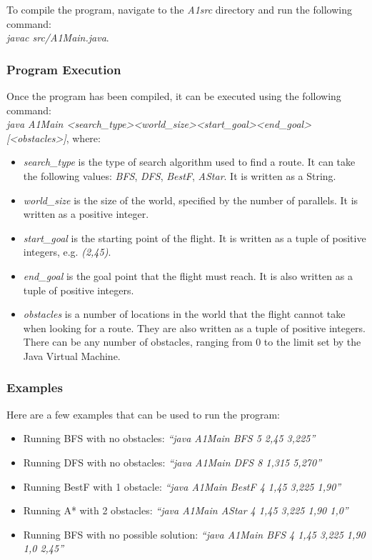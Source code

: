 \documentclass[letterpaper,12pt]{article}
\begin{document}
To compile the program, navigate to the \textit{A1src} directory and run the following command:\\

\textit{javac src/A1Main.java}.

\subsubsection{Program Execution}

Once the program has been compiled, it can be executed using the following command:\\

\textit{java A1Main \textless search\_type\textgreater \textless world\_size\textgreater \textless start\_goal\textgreater \textless end\_goal\textgreater [\textless obstacles\textgreater]}, where:

\begin{itemize}
    \item \textit{search\_type} is the type of search algorithm used to find a route. It can take the following values: \textit{BFS}, \textit{DFS}, \textit{BestF}, \textit{AStar}. It is written as a String.
    \item \textit{world\_size} is the size of the world, specified by the number of parallels. It is written as a positive integer.
    \item \textit{start\_goal} is the starting point of the flight. It is written as a tuple of positive integers, e.g. \textit{(2,45)}.
    \item \textit{end\_goal} is the goal point that the flight must reach. It is also written as a tuple of positive integers.
    \item \textit{obstacles} is a number of locations in the world that the flight cannot take when looking for a route. They are also written as a tuple of positive integers. There can be any number of obstacles, ranging from 0 to the limit set by the Java Virtual Machine.
\end{itemize}

\subsubsection{Examples}

Here are a few examples that can be used to run the program:

\begin{itemize}
    \item Running BFS with no obstacles: \textit{``java A1Main BFS 5 2,45 3,225''}
    \item Running DFS with no obstacles: \textit{``java A1Main DFS 8 1,315 5,270''}
    \item Running BestF with 1 obstacle: \textit{``java A1Main BestF 4 1,45 3,225 1,90''}
    \item Running A* with 2 obstacles: \textit{``java A1Main AStar 4 1,45 3,225 1,90 1,0''}
    \item Running BFS with no possible solution: \textit{``java A1Main BFS 4 1,45 3,225 1,90 1,0 2,45''}
\end{itemize}
\end{document}
